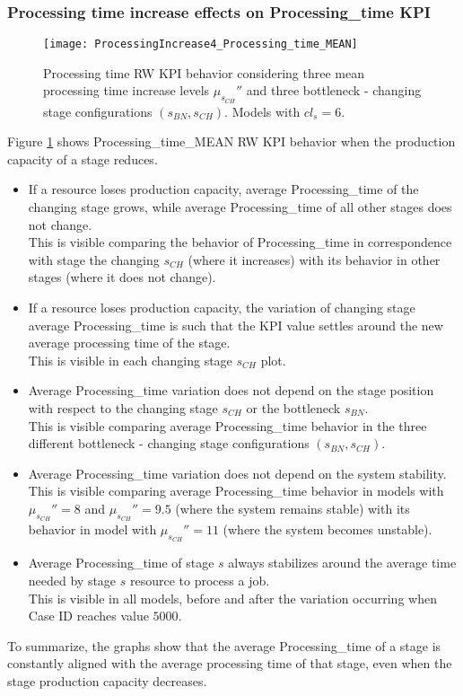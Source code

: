 \subsubsection{Processing time increase effects on Processing\_time KPI}
\begin{figure}[h] 
\centering
\texttt{[image: ProcessingIncrease4\_Processing\_time\_MEAN]}
\caption[Processing time RW KPI behavior considering different processing time increase levels]{Processing time RW KPI behavior considering three mean processing time increase levels $\mu_{s_{CH}}''$ and three bottleneck - changing stage configurations $(s_{BN},s_{CH})$. Models with $cl_s=6$.}
\label{fig:Processing time RW KPI behavior with different processing time increase levels}
\end{figure}
Figure \ref{fig:Processing time RW KPI behavior with different processing time increase levels} shows Processing\_time\_MEAN RW KPI behavior when the production capacity of a stage reduces. 
\begin{itemize}
\item If a resource loses production capacity, average Processing\_time of the changing stage grows, while average Processing\_time of all other stages does not change. \\This is visible comparing the behavior of Processing\_time in correspondence with stage the changing $s_{CH}$ (where it increases) with its behavior in other stages (where it does not change). 
\item If a resource loses production capacity, the variation of changing stage average Processing\_time is such that the KPI value settles around the new average processing time of the stage. \\This is visible in each changing stage $s_{CH}$ plot. 
\item Average Processing\_time variation does not depend on the stage position with respect to the changing stage $s_{CH}$ or the bottleneck $s_{BN}$. \\This is visible comparing average Processing\_time behavior in the three different bottleneck - changing stage configurations $(s_{BN},s_{CH})$. 
\item Average Processing\_time variation does not depend on the system stability. \\This is visible comparing average Processing\_time behavior in models with $\mu_{s_{CH}}''=8$ and $\mu_{s_{CH}}''=9.5$ (where the system remains stable) with its behavior in model with $\mu_{s_{CH}}''=11$ (where the system becomes unstable).
\item Average Processing\_time of stage $s$ always stabilizes around the average time needed by stage $s$ resource to process a job. \\This is visible in all models, before and after the variation occurring when Case ID reaches value $5000$.
\end{itemize}
To summarize, the graphs show that the average Processing\_time of a stage is constantly aligned with the average processing time of that stage, even when the stage production capacity decreases. 

